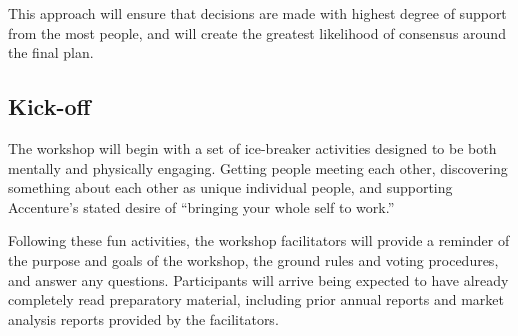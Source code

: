 This approach will ensure that decisions are made with highest degree of support from the most people, and will create the greatest likelihood of consensus around the final plan.

\subsection{Kick-off}

The workshop will begin with a set of ice-breaker activities designed to be both mentally and physically engaging. Getting people meeting each other, discovering something about each other as unique individual people, and supporting Accenture's stated desire of ``bringing your whole self to work.''

Following these fun activities, the workshop facilitators will provide a reminder of the purpose and goals of the workshop, the ground rules and voting procedures, and answer any questions. Participants will arrive being expected to have already completely read preparatory material, including prior annual reports and market analysis reports provided by the facilitators.
